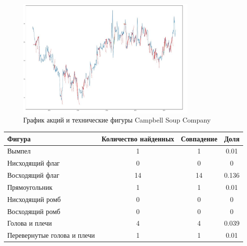 \documentclass[bachelor, och, coursework]{SCWorks}
\begin{document}
    \begin{figure}[H]
        \centering
        \includegraphics[width=0.8\textwidth]{pic/CPB.jpg}
        \caption{График акций и технические фигуры Campbell Soup Company}
    \end{figure}
   
    \begin{table}[!hbt]
        \centering
        \begin{tabular}{|l|c|c|c|}
        \hline
        Фигура                      & \multicolumn{1}{l|}{Количество найденных} & Совпадение & Доля  \\ \hline
        Вымпел                      & 1                                         & 1          & 0.01  \\ \hline
        Нисходящий флаг             & 0                                         & 0          & 0     \\ \hline
        Восходящий флаг             & 14                                        & 14         & 0.136 \\ \hline
        Прямоугольник               & 1                                         & 1          & 0.01  \\ \hline
        Нисходящий ромб             & 0                                         & 0          & 0     \\ \hline
        Восходящий ромб             & 0                                         & 0          & 0     \\ \hline
        Голова и плечи              & 4                                         & 4          & 0.039 \\ \hline
        Перевернутые голова и плечи & 1                                         & 1          & 0.01  \\ \hline
        \end{tabular}
        \end{table}
\end{document}
